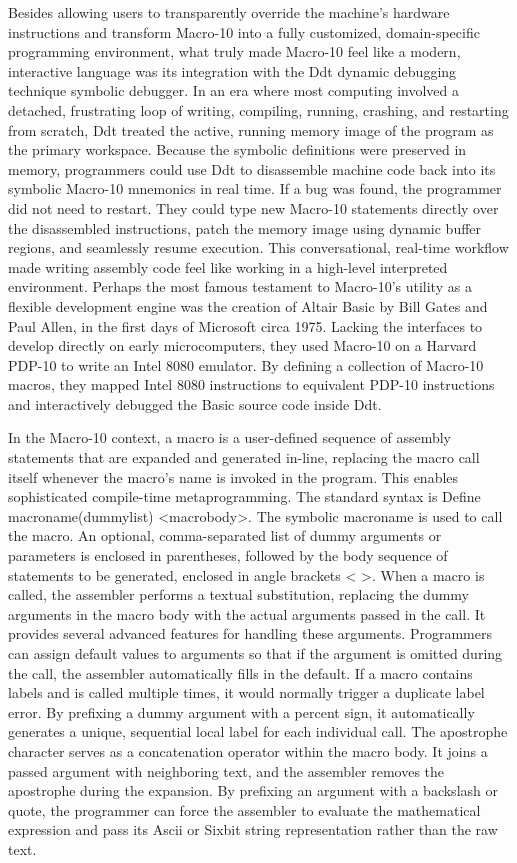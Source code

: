 Besides allowing users to transparently override the machine's hardware instructions and transform Macro-10 into a fully customized, domain-specific programming environment, what truly made Macro-10 feel like a modern, interactive language was its integration with the Ddt dynamic debugging technique symbolic debugger. In an era where most computing involved a detached, frustrating loop of writing, compiling, running, crashing, and restarting from scratch, Ddt treated the active, running memory image of the program as the primary workspace. Because the symbolic definitions were preserved in memory, programmers could use Ddt to disassemble machine code back into its symbolic Macro-10 mnemonics in real time. If a bug was found, the programmer did not need to restart. They could type new Macro-10 statements directly over the disassembled instructions, patch the memory image using dynamic buffer regions, and seamlessly resume execution. This conversational, real-time workflow made writing assembly code feel like working in a high-level interpreted environment. Perhaps the most famous testament to Macro-10's utility as a flexible development engine was the creation of Altair Basic by Bill Gates and Paul Allen, in the first days of Microsoft circa 1975. Lacking the interfaces to develop directly on early microcomputers, they used Macro-10 on a Harvard PDP-10 to write an Intel 8080 emulator. By defining a collection of Macro-10 macros, they mapped Intel 8080 instructions to equivalent PDP-10 instructions and interactively debugged the Basic source code inside Ddt.

In the Macro-10 context, a macro is a user-defined sequence of assembly statements that are expanded and generated in-line, replacing the macro call itself whenever the macro's name is invoked in the program. This enables sophisticated compile-time metaprogramming. The standard syntax is Define macroname(dummylist) <macrobody>. The symbolic macroname is used to call the macro. An optional, comma-separated list of dummy arguments or parameters is enclosed in parentheses, followed by the body sequence of statements to be generated, enclosed in angle brackets < >. When a macro is called, the assembler performs a textual substitution, replacing the dummy arguments in the macro body with the actual arguments passed in the call. It provides several advanced features for handling these arguments. Programmers can assign default values to arguments so that if the argument is omitted during the call, the assembler automatically fills in the default. If a macro contains labels and is called multiple times, it would normally trigger a duplicate label error. By prefixing a dummy argument with a percent sign, it automatically generates a unique, sequential local label for each individual call. The apostrophe character serves as a concatenation operator within the macro body. It joins a passed argument with neighboring text, and the assembler removes the apostrophe during the expansion. By prefixing an argument with a backslash or quote, the programmer can force the assembler to evaluate the mathematical expression and pass its Ascii or Sixbit string representation rather than the raw text.

